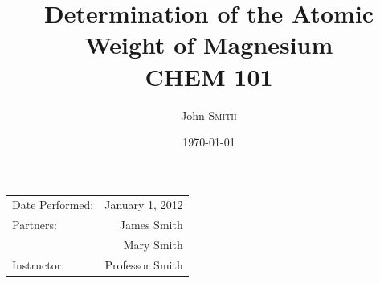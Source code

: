 \documentclass{article}
\title{Determination of the Atomic \\ Weight of Magnesium \\ CHEM 101} %
\author{John \textsc{Smith}} %
\date{\today} %
\begin{document}
\maketitle %

\begin{center}
\begin{tabular}{l r}
Date Performed: & January 1, 2012 \\ %
Partners: & James Smith \\ %
& Mary Smith \\
Instructor: & Professor Smith %
\end{tabular}
\end{center}








\end{document}
